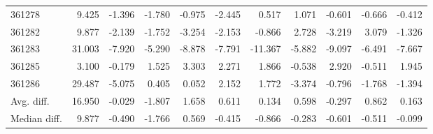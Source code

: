 \begin{tabular}{lrrrrrrrrrr}
361278 & 9.425 & -1.396 & -1.780 & -0.975 & -2.445 & 0.517 & 1.071 & -0.601 & -0.666 & -0.412 \\
361282 & 9.877 & -2.139 & -1.752 & -3.254 & -2.153 & -0.866 & 2.728 & -3.219 & 3.079 & -1.326 \\
361283 & 31.003 & -7.920 & -5.290 & -8.878 & -7.791 & -11.367 & -5.882 & -9.097 & -6.491 & -7.667 \\
361285 & 3.100 & -0.179 & 1.525 & 3.303 & 2.271 & 1.866 & -0.538 & 2.920 & -0.511 & 1.945 \\
361286 & 29.487 & -5.075 & 0.405 & 0.052 & 2.152 & 1.772 & -3.374 & -0.796 & -1.768 & -1.394 \\
Avg. diff. & 16.950 & -0.029 & -1.807 & 1.658 & 0.611 & 0.134 & 0.598 & -0.297 & 0.862 & 0.163 \\
Median diff. & 9.877 & -0.490 & -1.766 & 0.569 & -0.415 & -0.866 & -0.283 & -0.601 & -0.511 & -0.099 \\
\bottomrule
\end{tabular}
